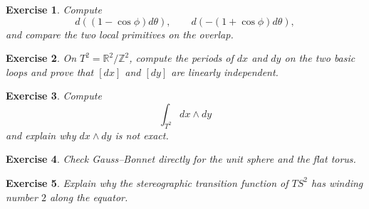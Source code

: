 \documentclass[11pt]{article}
\newtheorem{exercise}{Exercise}
\begin{document}
\begin{exercise}
Compute
\[
d((1-\cos\phi)d\theta),\qquad
d(-(1+\cos\phi)d\theta),
\]
and compare the two local primitives on the overlap.
\end{exercise}

\begin{exercise}
On \(T^2=\mathbb{R}^2/\mathbb{Z}^2\), compute the periods of \(dx\) and \(dy\) on the two basic loops and prove that \([dx]\) and \([dy]\) are linearly independent.
\end{exercise}

\begin{exercise}
Compute
\[
\int_{T^2}dx\wedge dy
\]
and explain why \(dx\wedge dy\) is not exact.
\end{exercise}

\begin{exercise}
Check Gauss--Bonnet directly for the unit sphere and the flat torus.
\end{exercise}

\begin{exercise}
Explain why the stereographic transition function of \(TS^2\) has winding number \(2\) along the equator.
\end{exercise}
\end{document}
